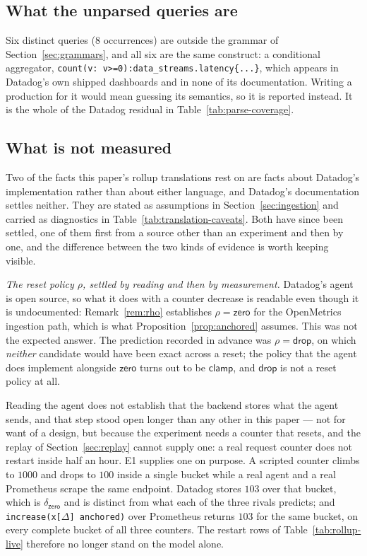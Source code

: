 \subsection{What the unparsed queries are}

Six distinct queries ($8$ occurrences) are outside the grammar of
Section~\ref{sec:grammars}, and all six are the same construct: a conditional aggregator,
\texttt{count(v: v>=0):data\_streams.latency\{...\}}, which appears in Datadog's own
shipped dashboards and in none of its documentation. Writing a production for it would
mean guessing its semantics, so it is reported instead. It is the whole of the Datadog
residual in Table~\ref{tab:parse-coverage}.

\subsection{What is not measured}
\label{sec:not-measured}

Two of the facts this paper's rollup translations rest on are facts about Datadog's
implementation rather than about either language, and Datadog's documentation settles
neither. They are stated as assumptions in Section~\ref{sec:ingestion} and carried as
diagnostics in Table~\ref{tab:translation-caveats}. Both have since been settled, one of
them first from a source other than an experiment and then by one, and the difference
between the two kinds of evidence is worth keeping visible.

\emph{The reset policy $\rho$, settled by reading and then by measurement.} Datadog's
agent is open source, so what it does with a counter decrease is readable even though it
is undocumented: Remark~\ref{rem:rho} establishes $\rho=\mathsf{zero}$ for the
OpenMetrics ingestion path, which is what Proposition~\ref{prop:anchored} assumes. This
was not the expected answer. The prediction recorded in advance was
$\rho=\mathsf{drop}$, on which \emph{neither} candidate would have been exact across a
reset; the policy that the agent does implement alongside $\mathsf{zero}$ turns out to be
$\mathsf{clamp}$, and $\mathsf{drop}$ is not a reset policy at all.

Reading the agent does not establish that the backend stores what the agent sends, and
that step stood open longer than any other in this paper --- not for want of a design,
but because the experiment needs a counter that resets, and the replay of
Section~\ref{sec:replay} cannot supply one: a real request counter does not restart
inside half an hour. E1 supplies one on purpose. A scripted counter climbs to $1000$ and
drops to $100$ inside a single bucket while a real agent and a real Prometheus scrape the
same endpoint. Datadog stores $103$ over that bucket, which is $\delta_{\mathsf{zero}}$
and is distinct from what each of the three rivals predicts; and
\texttt{increase(x[$\Delta$] anchored)} over Prometheus returns $103$ for the same
bucket, on every complete bucket of all three counters. The restart rows of
Table~\ref{tab:rollup-live} therefore no longer stand on the model alone.

